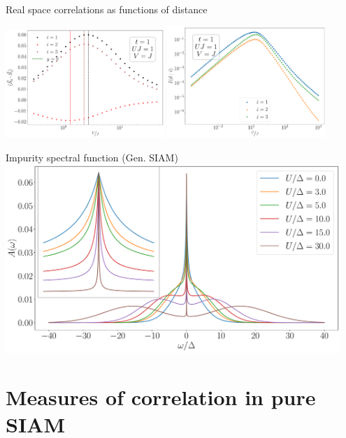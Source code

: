\documentclass[aspectratio=169]{beamer}
\begin{document}
\begin{frame}[noframenumbering]{Real space correlations as functions of distance}

\begin{center}
\includegraphics[width=0.45\textwidth]{figures/corr-all-t=1.000,J=1_over_U,V=J,N=4,U=0.016,100.000,95.pdf}
\includegraphics[width=0.45\textwidth]{figures/I-all-t=1.000,J=1_over_U,V=J,N=4,U=0.016,100.000,95.pdf}
\end{center}

\end{frame}

\begin{frame}[noframenumbering]{Impurity spectral function (Gen. SIAM)}
	\centering
	\includegraphics[width=0.95\textwidth]{figures/gen_siam_spec_func.pdf}
\end{frame}

\section{Measures of correlation in pure SIAM}
\end{document}
